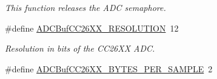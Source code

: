 \begin{DoxyCompactItemize}
\begin{DoxyCompactList}\small\item\em This function releases the A\+D\+C semaphore. \end{DoxyCompactList}\item 
\#define \hyperlink{_a_d_c_buf_c_c26_x_x_8h_a909590e3cb53a9e496ee7d706edad6cd}{A\+D\+C\+Buf\+C\+C26\+X\+X\+\_\+\+R\+E\+S\+O\+L\+U\+T\+I\+O\+N}~12
\begin{DoxyCompactList}\small\item\em Resolution in bits of the C\+C26\+X\+X A\+D\+C. \end{DoxyCompactList}\item 
\#define \hyperlink{_a_d_c_buf_c_c26_x_x_8h_a7445395fba5609c1fccae4b67c72f0cd}{A\+D\+C\+Buf\+C\+C26\+X\+X\+\_\+\+B\+Y\+T\+E\+S\+\_\+\+P\+E\+R\+\_\+\+S\+A\+M\+P\+L\+E}~2
\end{DoxyCompactItemize}
